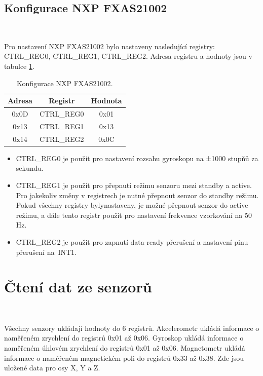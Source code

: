 \subsection{Konfigurace NXP FXAS21002}\

Pro nastavení NXP FXAS21002 bylo nastaveny nasledující registry: CTRL\_REG0, CTRL\_REG1, CTRL\_REG2.
Adresa registru a hodnoty jsou v tabulce \ref{tab:FXAS21002}.

\begin{table}[!h]
    \centering
    \begin{tabular}{ccc}
        \hline
        \textbf{Adresa} & \textbf{Registr} & \textbf{Hodnota} \\
        \hline
        0x0D            & CTRL\_REG0       & 0x01             \\
        0x13            & CTRL\_REG1       & 0x13             \\
        0x14            & CTRL\_REG2       & 0x0C             \\
        \hline
    \end{tabular}
    \caption{Konfigurace NXP FXAS21002\cite{FXAS21002}.}
    \label{tab:FXAS21002}
\end{table}

\begin{itemize}
    \item CTRL\_REG0 je použit pro nastavení rozsahu gyroskopu na ±1000 stupňů za sekundu\cite{FXAS21002}.

    \item CTRL\_REG1 je použit pro přepnutí režimu senzoru mezi standby a active. Pro jakekoliv změny v registrech je nutné přepnout senzor do standby režimu. Pokud všechny registry bylynastaveny, je možné přepnout senzor do active režimu, a dále tento registr použit pro nastavení frekvence vzorkování na 50 Hz\cite{FXAS21002}.

    \item CTRL\_REG2 je použit pro zapnutí data-ready přerušení a nastavení pinu přerušení na~INT1\cite{FXAS21002}.
\end{itemize}

\section{Čtení dat ze senzorů}\

Všechny senzory ukládají hodnoty do 6 registrů. Akcelerometr ukládá informace o
naměřeném zrychlení do registrů 0x01 až 0x06. Gyroskop ukládá informace o naměřeném
úhlovém zrychlení do registrů 0x01 až 0x06. Magnetometr ukládá informace o naměřeném
magnetickém poli do registrů 0x33 až 0x38. Zde jsou uložené data pro osy X, Y a Z.


